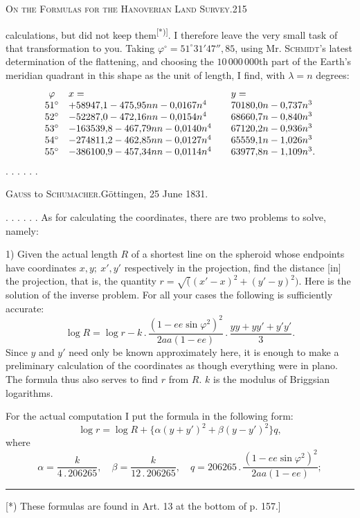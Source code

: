 \par\clearpage
\noindent\mbox{}\hfill{\small\textsc{On the Formulas for the Hanoverian Land Survey.}}\hfill215\par\medskip
\noindent calculations, but did not keep them\textsuperscript{[*)]}. I therefore leave the very small task of that transformation to you. Taking \(\varphi^\circ=51^\circ31'47''{,}85\), using Mr. \textsc{Schmidt}'s latest determination of the flattening, and choosing the \(10\,000\,000\)th part of the Earth's meridian quadrant in this shape as the unit of length, I find, with \(\lambda=n\) degrees:
\[
\begin{array}{c@{\quad}l@{\qquad}l}
\varphi&x=&y=\\
51^\circ&+58947{,}1-475{,}95nn-0{,}0167n^4&70180{,}0n-0{,}737n^3\\
52^\circ&-52287{,}0-472{,}16nn-0{,}0154n^4&68660{,}7n-0{,}840n^3\\
53^\circ&-163539{,}8-467{,}79nn-0{,}0140n^4&67120{,}2n-0{,}936n^3\\
54^\circ&-274811{,}2-462{,}85nn-0{,}0127n^4&65559{,}1n-1{,}026n^3\\
55^\circ&-386100{,}9-457{,}34nn-0{,}0114n^4&63977{,}8n-1{,}109n^3.
\end{array}
\]
. . . . . .
\bigskip
\begin{center}\textsc{Gauss} to \textsc{Schumacher}.\quad Göttingen, 25 June 1831.\end{center}
. . . . . . As for calculating the coordinates, there are two problems to solve, namely:

1) Given the actual length \(R\) of a shortest line on the spheroid whose endpoints have coordinates \(x,y;\ x',y'\) respectively in the projection, find the distance [in] the projection, that is, the quantity \(r=\surd((x'-x)^2+(y'-y)^2)\). Here is the solution of the inverse problem. For all your cases the following is sufficiently accurate:
\[
\log R=\log r-k\,.\,\frac{(1-ee\sin\varphi^2)^2}{2aa(1-ee)}\,.\,\frac{yy+yy'+y'y'}3.
\]
Since \(y\) and \(y'\) need only be known approximately here, it is enough to make a preliminary calculation of the coordinates as though everything were in plano. The formula thus also serves to find \(r\) from \(R\). \(k\) is the modulus of Briggsian logarithms.

For the actual computation I put the formula in the following form:
\[
\log r=\log R+\{\alpha(y+y')^2+\beta(y-y')^2\}q,
\]
\noindent where
\[
\alpha=\frac{k}{4\,.\,206265},\quad\beta=\frac{k}{12\,.\,206265},\quad q=206265\,.\,\frac{(1-ee\sin\varphi^2)^2}{2aa(1-ee)};
\]
\par\noindent\rule{4cm}{.4pt}\par
{\footnotesize\noindent\hspace*{\parindent}[*) These formulas are found in Art. 13 at the bottom of p. 157.]\par}

